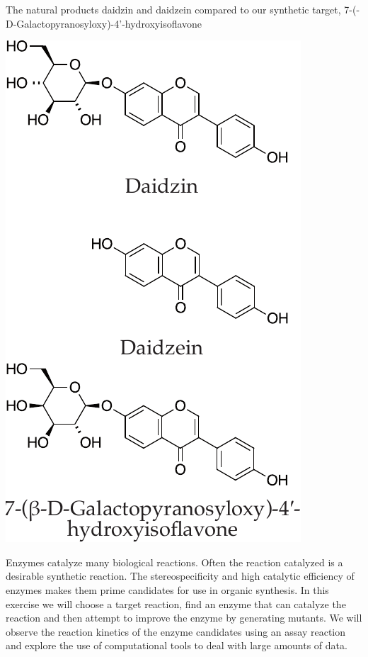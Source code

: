 \documentclass[]{tufte-handout}
\begin{document}
\begin{marginfigure}[5mm]

  \caption[0mm]{The natural products daidzin and daidzein compared to our synthetic target, 7-(\textbeta -D-Galactopyranosyloxy)-4'-hydroxyisoflavone} 
  \vspace{4mm}
    \centering
  \includegraphics[scale=0.6]{Daidzin2.pdf}
  \vspace{5mm}
  \label{fig:fig1}
\end{marginfigure}




Enzymes catalyze many biological reactions. Often the reaction catalyzed is a desirable synthetic reaction. The stereospecificity and high catalytic efficiency of enzymes makes them prime candidates for use in organic synth\-es\-is. In this exercise we will choose a target reaction, find an enzyme that can catalyze the reaction and then attempt to improve the enzyme by generating mutants. We will observe the reaction kinetics of the enzyme candidates using an assay reaction and explore the use of computational tools to deal with large amounts of data.
\end{document}
